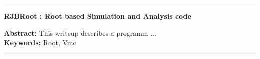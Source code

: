 \documentclass[a4paper,11pt,twoside]{manualstyle}
\begin{document}


\dominitoc




\tableofcontents

\mainmatter




\appendix







\cleardoublepage
\begin{vcenterpage}
\noindent\rule[2pt]{\textwidth}{0.5pt}
\begin{center}
{\large\textbf{R3BRoot : Root based Simulation and Analysis code\\}}
\end{center}
{\large\textbf{Abstract:}}
This writeup describes a programm ... \\ 
{\large\textbf{Keywords:}}
Root, Vmc
\\
\noindent\rule[2pt]{\textwidth}{0.5pt}
\end{vcenterpage}
\end{document}

